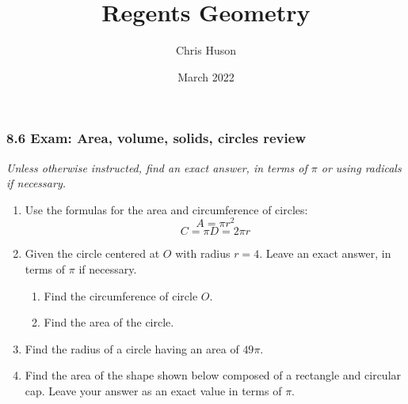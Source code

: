 \documentclass[12pt, twoside]{article}
\title{Regents Geometry}
\author{Chris Huson}
\date{March 2022}
\begin{document}
\subsubsection*{8.6 Exam: Area, volume, solids, circles review}
\emph{Unless otherwise instructed, find an exact answer, in terms of $\pi$ or using radicals if necessary.}
 \begin{enumerate}

  \item Use the formulas for the area and circumference of circles:
  \[A=\pi r^2\]
  \[C=\pi D = 2\pi r\]
  
  \item Given the circle centered at $O$ with radius $r=4$. Leave an exact answer, in terms of $\pi$ if necessary.
  \begin{multicols}{2}
    \begin{enumerate}
      \item Find the circumference of circle $O$. %
      \item Find the area of the circle.\vspace{2cm}
    \end{enumerate}
  \end{multicols}

  \item Find the radius of a circle having an area of $49 \pi$. \vspace{2cm}
  
  \item Find the area of the shape shown below composed of a rectangle and circular cap. Leave your answer as an exact value in terms of $\pi$.
    \begin{flushright}
  \end{flushright}\vspace{1cm}


\end{enumerate}
\end{document}
